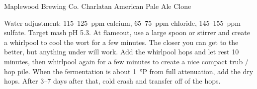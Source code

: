 \begin{recipe}{Maplewood Brewing Co. Charlatan American Pale Ale Clone}

\begin{aboutblock}
\sourceaha
\end{aboutblock}


\begin{methodandtiming}
 
\begin{mashsteps}
\end{mashsteps}

\begin{directions}
Water adjustment: 115--125~ppm calcium, 65--75~ppm chloride, 145--155~ppm
sulfate. Target mash pH 5.3. At flameout, use a large spoon or stirrer and
create a whirlpool to cool the wort for a few minutes. The closer you can get
to  the better, but anything under  will work. Add the
whirlpool hops and let rest 10 minutes, then whirlpool again for a few minutes
to create a nice compact trub / hop pile. When the fermentation is about 1~°P
from full attenuation, add the dry hops. After 3--7 days after that,
cold crash and transfer off of the hops.
\end{directions}

\end{methodandtiming}

\recipebreak

\begin{ingredientsblock}

\begin{malts}
\end{malts}

\begin{hops}
\end{hops}


\end{ingredientsblock}

\end{recipe}